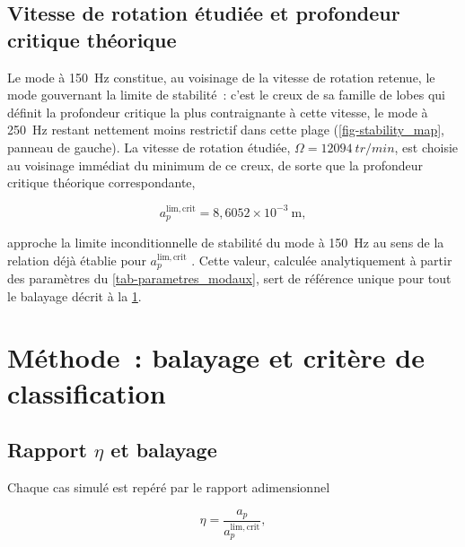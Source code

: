 \documentclass[
    11pt,
    a4paper
]{article}
\newcommand{\ap}{a_p}
\newcommand{\apcrit}{a_p^{\mathrm{lim,crit}}}
\begin{document}

\subsection{Vitesse de rotation étudiée et profondeur critique théorique}
\label{sec-vitesse_ap_crit}

Le mode à \SI{150}{Hz} constitue, au voisinage de la vitesse de rotation
retenue, le mode gouvernant la limite de stabilité~: c'est le creux de sa
famille de lobes qui définit la profondeur critique la plus contraignante à
cette vitesse, le mode à \SI{250}{Hz} restant nettement moins restrictif dans
cette plage (\cref{fig-stability_map}, panneau de gauche). La vitesse de
rotation étudiée, \(\Omega = \SI{12094}{tr/min}\), est choisie au voisinage
immédiat du minimum de ce creux, de sorte que la profondeur critique
théorique correspondante,

\begin{equation}
    \apcrit = 8,6052\times10^{-3}~\text{m},
    \label{eq-ap_crit_theo}
\end{equation}

approche la limite inconditionnelle de stabilité du mode à \SI{150}{Hz} au
sens de la relation déjà établie pour \(a_p^{\mathrm{lim,crit}}\)
. Cette valeur, calculée analytiquement à partir des paramètres du
\cref{tab-parametres_modaux}, sert de référence unique pour tout le balayage
décrit à la \cref{sec-methode}.

\section{Méthode~: balayage et critère de classification}
\label{sec-methode}

\subsection{Rapport \texorpdfstring{\(\eta\)}{eta} et balayage}
\label{sec-balayage}

Chaque cas simulé est repéré par le rapport adimensionnel

\begin{equation}
    \eta = \frac{\ap}{\apcrit},
    \label{eq-eta}
\end{equation}
\end{document}
